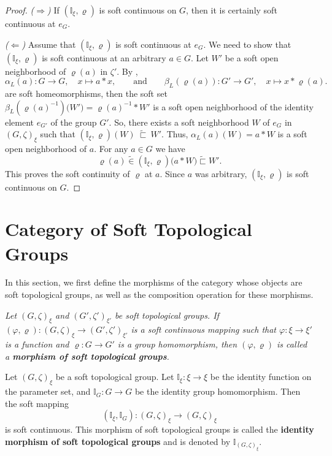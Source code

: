 \documentclass[preprint,12pt]{elsarticle}
\begin{document}
\begin{proof}
\emph{($\Rightarrow$)} If $(\mathbb{I}_\xi,\varrho)$ is soft continuous on $G$, then it is certainly soft continuous at $e_G$.

\smallskip
\emph{($\Leftarrow$)} Assume that $(\mathbb{I}_\xi,\varrho)$ is soft continuous at $e_G$.
We need to show that $(\mathbb{I}_\xi,\varrho)$ is soft continuous at an arbitrary $a\in G$. Let $W'$ be a soft open neighborhood of $\varrho(a)$ in $\zeta'$.
By \cite[Propsition 4.5]{Hida},
\[
\alpha_L(a)\colon G\to G,\quad x\mapsto a\ast x,
\qquad\text{and}\qquad
\beta_{L}(\varrho(a))\colon G'\to G',\quad x\mapsto x\ast\varrho(a) .
\]
are soft homeomorphisms, then the soft  set $\beta_{L}(\varrho(a)^{-1}) \bigl (W')=\varrho(a)^{-1}\ast W'$
is a soft open neighborhood of the identity element $e_{G'}$ of the group $G'$.
So, there exists a soft neighborhood $W$ of $e_G$ in $(G,\zeta)_\xi $ such that $(\mathbb{I}_\xi,\varrho)(W)\ \widetilde{\sqsubset}\ W'$.
Thus, $\alpha_L(a)(W)=a\ast W$  is a soft open  neighborhood of $a$.
For any $a\in G$ we have
\[
\varrho(a)\widetilde{\in}(\mathbb{I}_\xi,\varrho)\bigl(a\ast W)
\widetilde{\sqsubset} W'.
\]
This proves the soft continuity of $\varrho$ at $a$.
Since $a$ was arbitrary, $(\mathbb{I}_\xi,\varrho)$ is soft continuous on $G$.
\end{proof}


\section{Category of Soft Topological Groups}

In this section, we first define the morphisms of the category whose objects are soft topological groups,
as well as the composition operation for these morphisms.
\begin{defn}\em{
Let $( G,\zeta)_\xi  $  and $( G',\zeta')_{\xi'} $ be soft topological groups. If $(\varphi,\varrho): (G,\zeta)_\xi   \to (G',\zeta')_{\xi'}$  is a soft continuous mapping such that $\varphi: \xi \rightarrow \xi'$ is a function and $\varrho: G \rightarrow G'$ is a group homomorphism, then $(\varphi,\varrho)$  is called a \textbf{morphism of soft topological groups}.}
\end{defn}
\begin{ex}\em{

Let \( (G,\zeta)_\xi\) be a soft topological group.
Let \( \mathbb{I}_\xi : \xi \to \xi \) be the identity function on the parameter set,
and \( \mathbb{I}_G : G \to G \) be the identity group homomorphism. Then the soft mapping
\[
(\mathbb{I}_\xi, \mathbb{I}_G) : (G,\zeta)_\xi \rightarrow  (G,\zeta)_\xi
\]
is soft continuous.
This morphism of soft topological groups is called the \textbf{identity morphism of soft topological groups} and is denoted by \(
\mathbb{I}_{ (G,\zeta)_\xi }.
\)
}
\end{ex}
\end{document}
